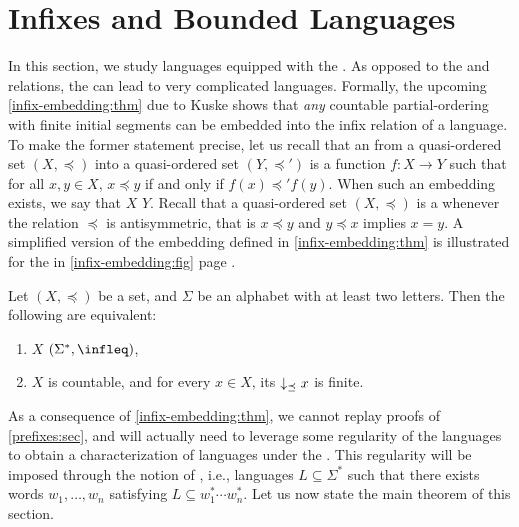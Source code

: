 \section{Infixes and Bounded Languages}
\label{infixes-bounded:sec}

\AP In this section, we study languages equipped with the .
As opposed to the  and  relations, the  can lead to very complicated  languages.
Formally, the upcoming \cref{infix-embedding:thm} due to Kuske shows that
\emph{any} countable partial-ordering with finite initial segments can be
embedded into the infix relation of a language. To make the former statement
precise, let us recall that an  from a quasi-ordered set
$(X, \preceq)$ into a quasi-ordered set $(Y, \preceq')$ is a function $f \colon
X \to Y$ such that for all $x, y \in X$, $x \preceq y$ if and only if $f(x)
\preceq' f(y)$. When such an embedding exists, we say that $X$  $Y$. Recall that a quasi-ordered set $(X, \preceq)$ is a  whenever the relation $\preceq$ is antisymmetric, that is $x \preceq
y$ and $y \preceq x$ implies $x = y$. 
A simplified version of the embedding defined in \cref{infix-embedding:thm} is illustrated
for the  in \cref{infix-embedding:fig} page \pageref{infix-embedding:fig}.
\begin{lemma}{\cite[Lemma 5.1]{DBLP:journals/ita/Kuske06}}
    \label{infix-embedding:thm}
    Let $(X, \preceq)$ be a  set,
    and $\Sigma$ be an alphabet with at least two letters.
    Then the following are equivalent:
    \begin{enumerate}
        \item 
            $X$  $(\Sigma^*, \infleq)$,
        \item 
            $X$ is countable, and for every $x \in X$,
            its 
            $\dwset[\preceq]{x}$ is finite.
    \end{enumerate}
\end{lemma}

\AP As a consequence of \cref{infix-embedding:thm}, we cannot replay proofs of
\cref{prefixes:sec}, and will actually need to leverage some regularity of the
languages to obtain a characterization of  languages
under the . This regularity will be imposed through the
notion of , i.e., languages $L \subseteq \Sigma^*$
such that there exists words $w_1, \dots, w_n$ satisfying $L \subseteq w_1^*
\cdots w_n^*$. Let us now state the main theorem of this section.

